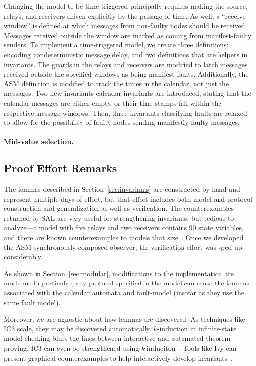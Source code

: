 \documentclass{llncs/llncs}
\newcommand{\lee}[1]{ } %
\newcommand{\lee}[1]{ {\color{blue}$<$lee: #1$>$} } %
\begin{document}
Changing the model to be time-triggered principally requires making the source, relays, and receivers driven explicitly by the passage of time. As well, a ``receive window'' is defined at which messages from non-faulty nodes should be received. Messages received outside the window are marked as coming from manifest-faulty senders. To implement a time-triggered model, we create three definitions: encoding nondeterministic message delay, and two definitions that are helpers in invariants. The guards in the relays and receivers are modified to latch messages received outside the specified windows as being manifest faults. Additionally, the ASM definition is modified to track the times in the calendar, not just the messages. Two new invariants calendar invariants are introduced, stating that the calendar messages are either empty, or their time-stamps fall within the respective message windows. Then, three invariants classifying faults are relaxed to allow for the possibility of faulty nodes sending manifestly-faulty messages.

\paragraph{Mid-value selection.}

\lee{todo}

\lee{any other modifications?}

\subsection{Proof Effort Remarks}
The lemmas described in Section~\ref{sec:invariants} are constructed by-hand and represent multiple days of effort, but that effort includes both model and protocol construction and generalization as well as verification. The counterexamples returned by SAL are very useful for strengthening invariants, but tedious to analyze---a model with five relays and two receivers contains 90 state variables, and there are known counterexamples to models that size~\cite{csl-93-2}. Once we developed the ASM synchronously-composed observer, the verification effort was sped up considerably.

As shown in Section~\ref{sec:modular}, modifications to the implementation are modular. In particular, any protocol specified in the model can reuse the lemmas associated with the calendar automata and fault-model (insofar as they use the same fault model).

Moreover, we are agnostic about how lemmas are discovered. As techniques like IC3 scale, they may be discovered automatically. $k$-induction in infinite-state model-checking blurs the lines between interactive and automated theorem proving. IC3 can even be strengthened using $k$-induciton~\cite{pdr-kind}. Tools like Ivy can present graphical counterexamples to help interactively develop invariants~\cite{ivy}.
\end{document}
